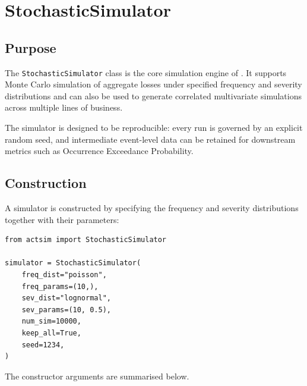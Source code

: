 \chapter{StochasticSimulator}
\label{chap:stochastic_simulator}

\section{Purpose}

The \texttt{StochasticSimulator} class is the core simulation engine of
\actsim. It supports Monte Carlo simulation of aggregate losses under
specified frequency and severity distributions and can also be used to
generate correlated multivariate simulations across multiple lines of
business.

The simulator is designed to be reproducible: every run is governed by an
explicit random seed, and intermediate event-level data can be retained
for downstream metrics such as Occurrence Exceedance Probability.

\section{Construction}

A simulator is constructed by specifying the frequency and severity
distributions together with their parameters:

\begin{lstlisting}[style=pythonstyle]
from actsim import StochasticSimulator

simulator = StochasticSimulator(
    freq_dist="poisson",
    freq_params=(10,),
    sev_dist="lognormal",
    sev_params=(10, 0.5),
    num_sim=10000,
    keep_all=True,
    seed=1234,
)
\end{lstlisting}

The constructor arguments are summarised below.

